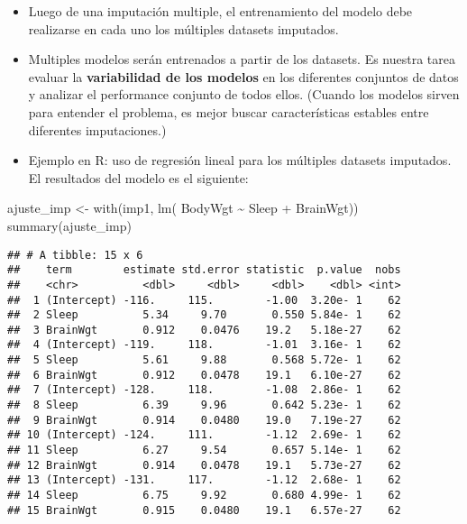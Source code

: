 \documentclass[
]{article}
\newenvironment{Shaded}{\begin{snugshade}}{\end{snugshade}}
\newcommand{\FunctionTok}[1]{\textcolor[rgb]{0.00,0.00,0.00}{#1}}
\newcommand{\NormalTok}[1]{#1}
\newcommand{\OtherTok}[1]{\textcolor[rgb]{0.56,0.35,0.01}{#1}}
\newcommand{\SpecialCharTok}[1]{\textcolor[rgb]{0.00,0.00,0.00}{#1}}
\begin{document}
\begin{itemize}
\item
  Luego de una imputación multiple, el entrenamiento del modelo debe
  realizarse en cada uno los múltiples datasets imputados.
\item
  Multiples modelos serán entrenados a partir de los datasets. Es
  nuestra tarea evaluar la \textbf{variabilidad de los modelos} en los
  diferentes conjuntos de datos y analizar el performance conjunto de
  todos ellos. (Cuando los modelos sirven para entender el problema, es
  mejor buscar características estables entre diferentes imputaciones.)
\item
  Ejemplo en R: uso de regresión lineal para los múltiples datasets
  imputados. El resultados del modelo es el siguiente:
\end{itemize}

\begin{Shaded}
\begin{Highlighting}[]
\NormalTok{ajuste\_imp }\OtherTok{\textless{}{-}} \FunctionTok{with}\NormalTok{(imp1, }\FunctionTok{lm}\NormalTok{( BodyWgt }\SpecialCharTok{\textasciitilde{}}\NormalTok{ Sleep }\SpecialCharTok{+}\NormalTok{ BrainWgt))}
\FunctionTok{summary}\NormalTok{(ajuste\_imp)}
\end{Highlighting}
\end{Shaded}

\begin{verbatim}
## # A tibble: 15 x 6
##    term        estimate std.error statistic  p.value  nobs
##    <chr>          <dbl>     <dbl>     <dbl>    <dbl> <int>
##  1 (Intercept) -116.     115.        -1.00  3.20e- 1    62
##  2 Sleep          5.34     9.70       0.550 5.84e- 1    62
##  3 BrainWgt       0.912    0.0476    19.2   5.18e-27    62
##  4 (Intercept) -119.     118.        -1.01  3.16e- 1    62
##  5 Sleep          5.61     9.88       0.568 5.72e- 1    62
##  6 BrainWgt       0.912    0.0478    19.1   6.10e-27    62
##  7 (Intercept) -128.     118.        -1.08  2.86e- 1    62
##  8 Sleep          6.39     9.96       0.642 5.23e- 1    62
##  9 BrainWgt       0.914    0.0480    19.0   7.19e-27    62
## 10 (Intercept) -124.     111.        -1.12  2.69e- 1    62
## 11 Sleep          6.27     9.54       0.657 5.14e- 1    62
## 12 BrainWgt       0.914    0.0478    19.1   5.73e-27    62
## 13 (Intercept) -131.     117.        -1.12  2.68e- 1    62
## 14 Sleep          6.75     9.92       0.680 4.99e- 1    62
## 15 BrainWgt       0.915    0.0480    19.1   6.57e-27    62
\end{verbatim}
\end{document}

